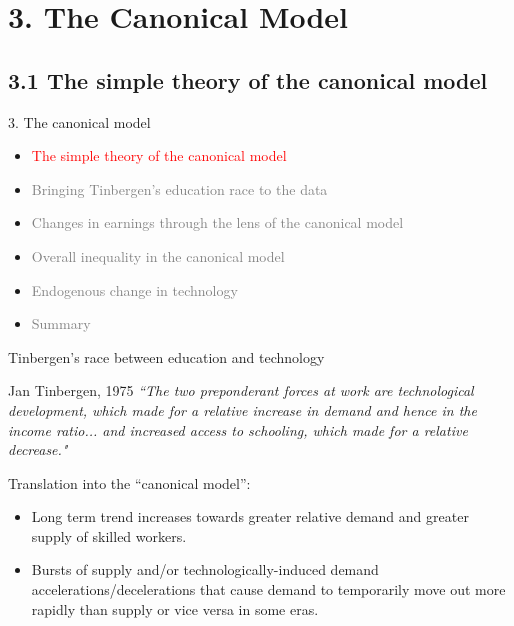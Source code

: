 \documentclass[notes=show]{beamer}
\begin{document}
\section{3. The Canonical Model}

\subsection{3.1 The simple theory of the canonical model}

\begin{frame}{3. The canonical model}
\begin{itemize}
\item[\textcolor{red}{3.1}] \textcolor{red}{The simple theory of the canonical model} \medskip
\item[\textcolor{gray}{3.2}] \textcolor{gray}{Bringing Tinbergen's education race to the data} \medskip
\item[\textcolor{gray}{3.3}] \textcolor{gray}{Changes in earnings through the lens of the canonical model} \medskip
\item[\textcolor{gray}{3.4}] \textcolor{gray}{Overall inequality in the canonical model} \medskip
\item[\textcolor{gray}{3.5}] \textcolor{gray}{Endogenous change in technology} \medskip
\item[\textcolor{gray}{3.6}] \textcolor{gray}{Summary}
\end{itemize}
\end{frame}

\begin{frame}{Tinbergen's race between education and technology}
\begin{block}{Jan Tinbergen, 1975}
\textit{``The two preponderant forces at work are technological development, which made for a relative increase in demand and hence in the income ratio... and increased access to schooling, which made for a relative decrease."}
\end{block} \medskip
Translation into the ``canonical model'': \medskip
\begin{itemize}
\item Long term trend increases towards greater relative demand and greater supply of skilled workers. \medskip
\item Bursts of supply and/or technologically-induced demand accelerations/decelerations that cause demand to temporarily move out more rapidly than supply or vice versa in some eras.
\end{itemize}
\end{frame}
\end{document}
